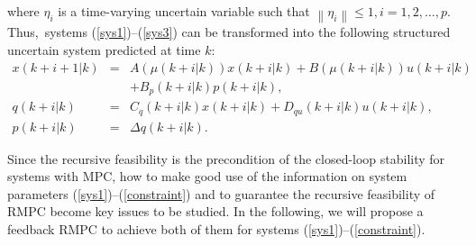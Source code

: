 \documentclass{singlecol-new}
\theoremstyle{TH}{
\newtheorem{lemma}{Lemma}
\newtheorem{theorem}[lemma]{Theorem}
\newtheorem{corrolary}[lemma]{Corrolary}
\newtheorem{conjecture}[lemma]{Conjecture}
\newtheorem{proposition}[lemma]{Proposition}
\newtheorem{claim}[lemma]{Claim}
\newtheorem{stheorem}[lemma]{Wrong Theorem}
\newtheorem{algorithm}{Algorithm}
}
\theoremstyle{THrm}{
\newtheorem{definition}{Definition}[section]
\newtheorem{question}{Question}[section]
\newtheorem{remark}{Remark}
\newtheorem{scheme}{Scheme}
}
\theoremstyle{THhit}{
\newtheorem{case}{Case}[section]
}
\begin{document}
\noindent where $\eta _i $ is a time-varying uncertain variable such
that $\left\| {\eta _i } \right\| \leq 1,i = 1,2, \ldots ,p$.
Thus,~systems (\ref{sys1})--(\ref{sys3}) can be transformed into the
following structured uncertain system predicted at time $k$:
\begin{eqnarray*}\label{m1}
x(k + i + 1|k) &=& A(\mu (k + i|k))x(k + i|k)+ B(\mu (k + i|k)) u(k
+i|k)\nonumber\\ && + B_p (k + i|k)p(k + i|k),\\\label{m2} q(k +
i|k)&=&C_q(k +
i|k)x(k + i|k)+ D_{qu}(k + i|k)u(k + i|k),\\
\label{m3} p(k + i|k) &=& \Delta q(k + i|k).\hspace{9em}
\end{eqnarray*}
%

\noindent Since the recursive feasibility is the precondition of the
closed-loop stability for systems with MPC, how to make good use of
the information on system parameters
(\ref{sys1})--(\ref{constraint}) and to guarantee the recursive
feasibility of RMPC become key issues to be studied. In the
following, we will propose a feedback RMPC to achieve both of them
for systems (\ref{sys1})--(\ref{constraint}).
\end{document}
